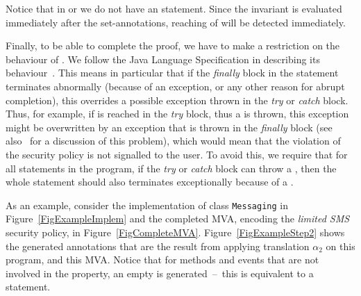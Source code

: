 Notice that in \postset or \excset we do not have an \Assert
statement. Since the invariant is evaluated immediately after the
set-annotations, reaching of \halted will be detected immediately. 

Finally, to be able to complete the proof, we have to make a
restriction on the behaviour of \TryCatch. We follow the Java Language
Specification in describing its behaviour~\cite{GoslingJSB05}. This
means in particular that if the \emph{finally} block in the statement
terminates abnormally (because of an exception, or any other reason
for abrupt completion), this overrides a possible exception thrown in
the \emph{try} or \emph{catch} block. Thus, for example, if \halted
is reached in the \emph{try} block, thus a \JMLExc is thrown, this
exception might be overwritten by an exception that is thrown in the
\emph{finally} block (see also~\cite{Huisman08} for a discussion of
this problem), which would mean that the violation of the security
policy is not signalled to the user. To avoid this, we require that
for all \TryCatch statements in the program, if the \emph{try} or
\emph{catch} block can throw a \JMLExc, then the whole statement
should also terminates exceptionally because of a \JMLExc. 





As an example, consider the implementation of class \texttt{Messaging}
in Figure~\ref{FigExampleImplem} and the completed MVA, encoding the
\emph{limited SMS} security policy, in
Figure~\ref{FigCompleteMVA}. Figure~\ref{FigExampleStep2} shows the
generated annotations that are the result from applying translation
\(\alpha_2\) on this program, and this MVA. Notice that for methods
and events that are not involved in the property, an empty \CaseJML is
generated~--~this is equivalent to a \Skip statement.

